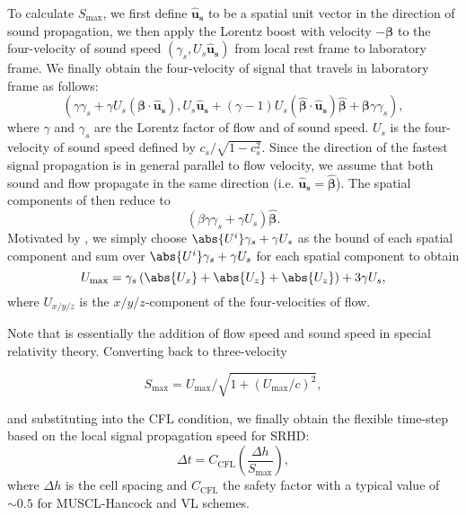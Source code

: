 To calculate $S_{\text{max}}$, we first define $\mathbf{\hat{u}_s}$ to be a spatial unit vector in the direction of sound propagation, we then apply the Lorentz boost with velocity $-\pmb{\beta}$ to the four-velocity of sound speed $(\gamma_s, U_s\mathbf{\hat{u}_s})$ from local rest frame to laboratory frame. We finally obtain the four-velocity of signal that travels in laboratory frame as follows:
\begin{equation}
    \left(\gamma\gamma_s+\gamma U_s\left(\pmb{\beta}\cdot\mathbf{\hat{u}_s}\right),U_{s}\mathbf{\mathbf{\hat{u}_s}}+\left(\gamma-1\right)U_s\left(\pmb{\hat{\beta}}\cdot\mathbf{\hat{u}_s}\right)\pmb{\hat{\beta}}+\pmb{\beta}\gamma\gamma_s\right),
    \label{time_step_propagation of information}
\end{equation}
where $\gamma$ and $\gamma_s$ are the Lorentz factor of flow and of sound speed. $U_s$ is the four-velocity of sound speed defined by $c_s/\sqrt{1-c_s^2}$. Since the direction of the fastest signal propagation is in general parallel to flow velocity, we assume that both sound and flow propagate in the same direction (i.e. $\mathbf{\hat{u}_s}=\pmb{\hat{\beta}}$). The spatial components of  then reduce to
\begin{equation}
    \left(\beta \gamma \gamma_s+\gamma U_s\right)\pmb{\hat{\beta}}.
    \label{time_step_x}
\end{equation}
Motivated by , we simply choose $\abs{U^{i}}\gamma_s+\gamma U_s$ as the bound of each spatial component and sum over $\abs{U^{i}}\gamma_s+\gamma U_s$ for each spatial component to obtain
\begin{equation}
U_{\text{max}}
=\gamma_{s}\left(\abs{U_{x}}+\abs{U_{z}}+\abs{U_{z}}\right)+3\gamma U_s,
\label{time_step_U_max}
\end{equation}
where $U_{x/y/z}$ is the $x/y/z$-component of the four-velocities of flow.

Note that  is essentially the addition of flow speed and sound speed in special relativity theory. Converting  back to three-velocity

\begin{equation}
S_{\text{max}}=U_{\text{max}}/\sqrt{1+\left(U_{\text{max}}/c\right)^2}, \label{SMax}
\end{equation}

and substituting  into the CFL condition, we finally obtain the flexible time-step based on the local signal propagation speed for SRHD:
\begin{equation}
\label{time_step_sound_speed}
\Delta t = C_{\text{CFL}}\left(\frac{\Delta h}{S_{\text{max}}}\right),
\end{equation}
where $\Delta h$ is the cell spacing and $C_{\text{CFL}}$ the safety factor with a typical value of $\sim 0.5$ for MUSCL-Hancock and VL schemes.

